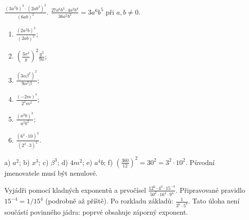 \documentclass[11pt,a4paper]{article}
\begin{document}
\begin{prikladReseniBox}[title={Příklad 6 — zjednoduš celý výraz},breakable=false]
$\displaystyle\frac{(3a^2b)^3\cdot(2ab^2)^2}{(6ab)^2}$.
\tcblower
$\displaystyle\frac{27a^6b^3\cdot4a^2b^4}{36a^2b^2}
=\boxed{3a^6b^5}$ při $a,b\ne0$.
\end{prikladReseniBox}
\begin{zadaniReseniBox}[title={Samostatná práce 6 — šest závěrečných úloh}]
\begin{enumerate}[label=\alph*)]
\item $\frac{(2a^2b)^2}{(2ab)^2}$;
\item $\left(\frac{3x^2}{y}\right)^2\frac{y^2}{9x}$;
\item $\frac{(3\alpha\beta^2)^2}{9\alpha^2\beta}$;
\item $\frac{(-2m)^4}{2^2m^2}$;
\item $\frac{(a^2b)^3}{a^2b^2}$;
\item $\frac{(6^2\cdot10)^2}{(2^2\cdot3)^2}$.
\end{enumerate}
\tcblower
 a) $a^2$; b) $x^3$; c) $\beta^3$;
 d) $4m^2$; e) $a^4b$;
 f) $\left(\frac{360}{12}\right)^2=30^2=3^2\cdot10^2$.
Původní jmenovatele musí být nenulové.
\end{zadaniReseniBox}
\begin{zadaniReseniBox}[title={Rozšiřující příklad 6 — můstek k hodině 28},breakable=false]
Vyjádři pomocí kladných exponentů a prvočísel
$\displaystyle\frac{12^6\cdot4^3\cdot15^{-4}}{50^2\cdot16^4\cdot9^4}$.
\tcblower
Připravované pravidlo $15^{-4}=1/15^4$ (podrobně až příště).
Po rozkladu základů: $\boxed{\frac{1}{3^6\cdot5^8}}$.
Tato úloha není součástí povinného jádra: poprvé obsahuje záporný exponent.
\end{zadaniReseniBox}
\end{document}
